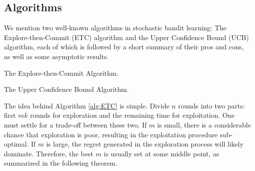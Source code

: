 \documentclass[10pt,a4paper]{amsart}
\numberwithin{equation}{section}
\theoremstyle{plain}
\theoremstyle{definition}
\begin{document}
\subsection{Algorithms}

We mention two well-known algorithms in stochastic bandit learning: The Explore-then-Commit (ETC) algorithm and the Upper Confidence Bound (UCB) algorithm, each of which is followed by a short summary of their pros and cons, as well as some asymptotic results.   


\begin{algorithm}
\DontPrintSemicolon
\caption{The Explore-then-Commit Algorithm. } 
\label{alg:ETC}
\end{algorithm}

\begin{algorithm}
\DontPrintSemicolon
\caption{The Upper Confidence Bound Algorithm. } 
\label{alg:UCB}
\end{algorithm}

The idea behind Algorithm \ref{alg:ETC} is simple. Divide $n$ rounds into two parts: first $mk$ rounds for exploration and the remaining time for exploitation. One must settle for a trade-off between these two. If $m$ is small, there is a considerable chance that exploration is poor, resulting in the exploitation procedure sub-optimal.  If $m$ is large, the regret generated in the exploration process will likely dominate. Therefore, the best $m$ is usually set at some middle point, as summarized in the following theorem. 
\end{document}
